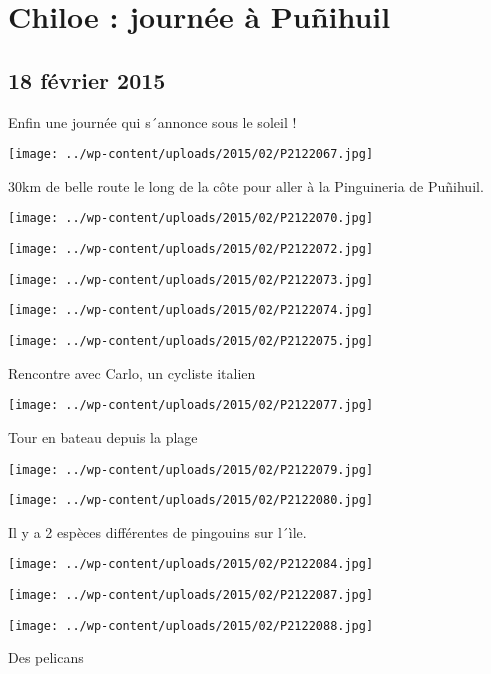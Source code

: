 \chapter{Chiloe : journée à Puñihuil}
\section*{18 février 2015}
Enfin une journée qui s´annonce sous le soleil ! \newline
 \newline
\centerline{\texttt{[image: ../wp-content/uploads/2015/02/P2122067.jpg]} } 
 \newline
 30km de belle route le long de la côte pour aller à la Pinguineria de Puñihuil. \newline
 \newline
\centerline{\texttt{[image: ../wp-content/uploads/2015/02/P2122070.jpg]} } 
 \newline
\centerline{\texttt{[image: ../wp-content/uploads/2015/02/P2122072.jpg]} } 
 \newline
\centerline{\texttt{[image: ../wp-content/uploads/2015/02/P2122073.jpg]} } 
 \newline
\centerline{\texttt{[image: ../wp-content/uploads/2015/02/P2122074.jpg]} } 
 \newline
\centerline{\texttt{[image: ../wp-content/uploads/2015/02/P2122075.jpg]} } 
 Rencontre avec Carlo, un cycliste italien \newline
 \newline
\centerline{\texttt{[image: ../wp-content/uploads/2015/02/P2122077.jpg]} } 
 Tour en bateau depuis la plage \newline
 \newline
\centerline{\texttt{[image: ../wp-content/uploads/2015/02/P2122079.jpg]} } 
 \newline
\centerline{\texttt{[image: ../wp-content/uploads/2015/02/P2122080.jpg]} } 
 Il y a 2 espèces différentes de pingouins sur l´ìle. \newline
\centerline{\texttt{[image: ../wp-content/uploads/2015/02/P2122084.jpg]} } 
 \newline
\centerline{\texttt{[image: ../wp-content/uploads/2015/02/P2122087.jpg]} } 
 \newline
\centerline{\texttt{[image: ../wp-content/uploads/2015/02/P2122088.jpg]} } 
 Des pelicans \newline
